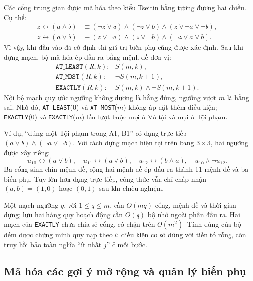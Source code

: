 Các cổng trung gian được mã hóa theo kiểu Tseitin bằng tương đương hai chiều. Cụ thể:
\begin{align*}
z\leftrightarrow(a\land b)&\equiv
(\neg z\lor a)\land(\neg z\lor b)\land(z\lor\neg a\lor\neg b),\\
z\leftrightarrow(a\lor b)&\equiv
(z\lor\neg a)\land(z\lor\neg b)\land(\neg z\lor a\lor b).
\end{align*}
Vì vậy, khi đầu vào đã cố định thì giá trị biến phụ cũng được xác định. Sau khi dựng mạch, bộ mã hóa ép đầu ra bằng mệnh đề đơn vị:
\[
\begin{array}{ll}
\texttt{AT\_LEAST}(R,k): & S(m,k),\\
\texttt{AT\_MOST}(R,k): & \neg S(m,k+1),\\
\texttt{EXACTLY}(R,k): & S(m,k)\land\neg S(m,k+1).
\end{array}
\]
Nội bộ mạch quy ước ngưỡng không dương là hằng đúng, ngưỡng vượt $m$ là hằng sai. Nhờ đó, \texttt{AT\_LEAST}(0) và \texttt{AT\_MOST}($m$) không áp đặt thêm điều kiện; \texttt{EXACTLY}(0) và \texttt{EXACTLY}($m$) lần lượt buộc mọi ô Vô tội và mọi ô Tội phạm.

Ví dụ, ``đúng một Tội phạm trong A1, B1'' có dạng trực tiếp $(a\lor b)\land(\neg a\lor\neg b)$. Với cách dựng mạch hiện tại trên bảng $3\times3$, hai ngưỡng được xây riêng:
\[
u_{10}\leftrightarrow(a\lor b),\quad
u_{11}\leftrightarrow(a\lor b),\quad
u_{12}\leftrightarrow(b\land a),\quad
u_{10}\land\neg u_{12}.
\]
Ba cổng sinh chín mệnh đề, cộng hai mệnh đề ép đầu ra thành 11 mệnh đề và ba biến phụ. Tuy lớn hơn dạng trực tiếp, công thức vẫn chỉ chấp nhận $(a,b)=(1,0)$ hoặc $(0,1)$ sau khi chiếu nghiệm.

Một mạch ngưỡng $q$, với $1\le q\le m$, cần $O(mq)$ cổng, mệnh đề và thời gian dựng; lưu hai hàng quy hoạch động cần $O(q)$ bộ nhớ ngoài phần đầu ra. Hai mạch của \texttt{EXACTLY} chưa chia sẻ cổng, có chặn trên $O(m^2)$. Tính đúng của bộ đếm được chứng minh quy nạp theo $i$: điều kiện cơ sở đúng với tiền tố rỗng, còn truy hồi bảo toàn nghĩa ``ít nhất $j$'' ở mỗi bước.

\subsection{Mã hóa các gợi ý mở rộng và quản lý biến phụ}
\label{subsec:ma-hoa-mo-rong-bien-phu}

